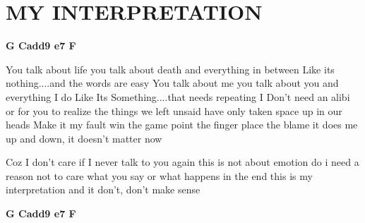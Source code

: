 \documentclass[../../../songbook.tex]{subfiles}
\begin{document}
\TabPositions{10cm} %
\section*{MY INTERPRETATION}
{}
\vspace{0.5cm}
{\color{red}\textbf{G   Cadd9  e7  F} } \newline
{\footnotesize
You talk about life you talk about death and everything in between	\newline
Like its nothing....and the words are easy				 \newline
You talk about me you talk about you and everything I do		\newline
Like Its Something....that needs repeating				   \newline            
I Don't need an alibi or for you to realize				 \newline
the things we left unsaid have only taken space up in our heads	 \newline
Make it my fault win the game point the finger place the blame	\newline
it does me up and down, it doesn't matter now			\newline
  
\-\hspace{1cm} Coz I don't care if I never talk to you again			\newline
\-\hspace{1cm} this is not about emotion do i need a reason not to care	\newline
\-\hspace{1cm} what you say or what happens in the end			 \newline
\-\hspace{1cm} this is my interpretation and it don't, don't make sense	\newline

{\color{red}\textbf{G   Cadd9  e7  F} } \newline
            
}
\end{document}
